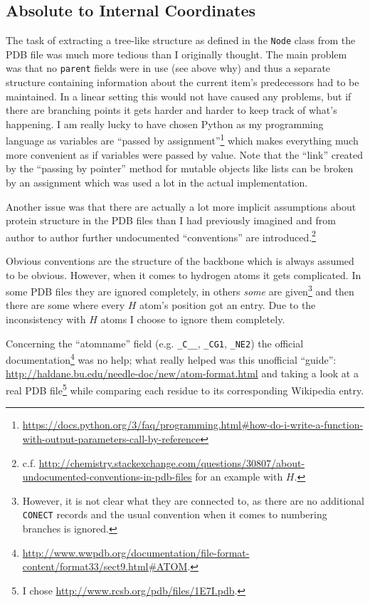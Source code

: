\subsection{Absolute to Internal Coordinates}
The task of extracting a tree-like structure as defined in the \texttt{Node} class from the PDB file was much more tedious than I originally thought.
The main problem was that no \texttt{parent} fields were in use (see above why) and thus a separate structure containing information about the current item's predecessors had to be maintained.
In a linear setting this would not have caused any problems, but if there are branching points it gets harder and harder to keep track of what's happening. I am really lucky to have chosen Python as my programming language as variables are ``passed by assignment''\footnote{\url{https://docs.python.org/3/faq/programming.html\#how-do-i-write-a-function-with-output-parameters-call-by-reference}} which makes everything much more convenient as if variables were passed by value. Note that the ``link'' created by the ``passing by pointer'' method for mutable objects like lists can be broken by an assignment which was used a lot in the actual implementation.

Another issue was that there are actually a lot more implicit assumptions about protein structure in the PDB files than I had previously imagined and from author to author further undocumented ``conventions'' are introduced.\footnote{c.f. \url{http://chemistry.stackexchange.com/questions/30807/about-undocumented-conventions-in-pdb-files} for an example with $H$.}

Obvious conventions are the structure of the backbone which is always assumed to be obvious. However, when it comes to hydrogen atoms it gets complicated. In some PDB files they are ignored completely, in others \textit{some} are given\footnote{However, it is not clear what they are connected to, as there are no additional \texttt{CONECT} records and the usual convention when it comes to numbering branches is ignored.} and then there are some where every $H$ atom's position got an entry. Due to the inconsistency with $H$ atoms I choose to ignore them completely.

Concerning the ``atomname'' field (e.g. \texttt{\_C\_\_}, \texttt{\_CG1}, \texttt{\_NE2}) the official documentation\footnote{\url{http://www.wwpdb.org/documentation/file-format-content/format33/sect9.html\#ATOM}.} was no help; what really helped was this unofficial ``guide'': \url{http://haldane.bu.edu/needle-doc/new/atom-format.html} and taking a look at a real PDB file\footnote{I chose \url{http://www.rcsb.org/pdb/files/1E7I.pdb}.} while comparing each residue to its corresponding Wikipedia entry.

